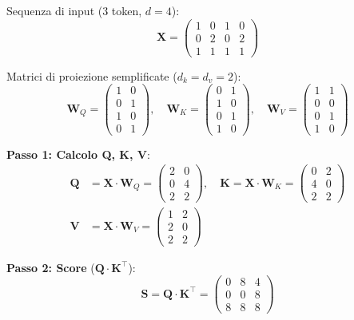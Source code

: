 \documentclass[12pt,a4paper]{article}
\begin{document}
\begin{examplebox}
Sequenza di input (3 token, $d = 4$):
\[
\mathbf{X} = \begin{pmatrix} 1 & 0 & 1 & 0 \\ 0 & 2 & 0 & 2 \\ 1 & 1 & 1 & 1 \end{pmatrix}
\]

Matrici di proiezione semplificate ($d_k = d_v = 2$):
\[
\mathbf{W}_Q = \begin{pmatrix} 1 & 0 \\ 0 & 1 \\ 1 & 0 \\ 0 & 1 \end{pmatrix}, \quad
\mathbf{W}_K = \begin{pmatrix} 0 & 1 \\ 1 & 0 \\ 0 & 1 \\ 1 & 0 \end{pmatrix}, \quad
\mathbf{W}_V = \begin{pmatrix} 1 & 1 \\ 0 & 0 \\ 0 & 1 \\ 1 & 0 \end{pmatrix}
\]

\textbf{Passo 1: Calcolo Q, K, V}:
\begin{align*}
\mathbf{Q} &= \mathbf{X} \cdot \mathbf{W}_Q = \begin{pmatrix} 2 & 0 \\ 0 & 4 \\ 2 & 2 \end{pmatrix}, \quad
\mathbf{K} = \mathbf{X} \cdot \mathbf{W}_K = \begin{pmatrix} 0 & 2 \\ 4 & 0 \\ 2 & 2 \end{pmatrix} \\
\mathbf{V} &= \mathbf{X} \cdot \mathbf{W}_V = \begin{pmatrix} 1 & 2 \\ 2 & 0 \\ 2 & 2 \end{pmatrix}
\end{align*}

\textbf{Passo 2: Score} ($\mathbf{Q} \cdot \mathbf{K}^\top$):
\[
\mathbf{S} = \mathbf{Q} \cdot \mathbf{K}^\top = \begin{pmatrix} 0 & 8 & 4 \\ 0 & 0 & 8 \\ 8 & 8 & 8 \end{pmatrix}
\]


\end{examplebox}
\end{document}
